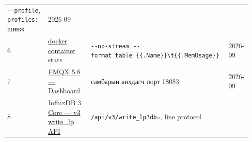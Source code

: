 \begin{longtable}[]{@{}llll@{}}
\begin{minipage}[t]{0.22\columnwidth}
\texttt{-\/-profile}, \texttt{profiles:} шинж\strut
\end{minipage} & \begin{minipage}[t]{0.22\columnwidth}\raggedright
2026-09\strut
\end{minipage}\tabularnewline
\begin{minipage}[t]{0.22\columnwidth}\raggedright
6\strut
\end{minipage} & \begin{minipage}[t]{0.22\columnwidth}\raggedright
\href{https://docs.docker.com/reference/cli/docker/container/stats/}{docker container stats}\strut
\end{minipage} & \begin{minipage}[t]{0.22\columnwidth}\raggedright
\texttt{-\/-no-stream}, \texttt{-\/-format\ \textquotesingle{}table\ \{\{.Name\}\}\textbackslash{}t\{\{.MemUsage\}\}\textquotesingle{}}\strut
\end{minipage} & \begin{minipage}[t]{0.22\columnwidth}\raggedright
2026-09\strut
\end{minipage}\tabularnewline
\begin{minipage}[t]{0.22\columnwidth}\raggedright
7\strut
\end{minipage} & \begin{minipage}[t]{0.22\columnwidth}\raggedright
\href{https://docs.emqx.com/en/emqx/v5.8/guides/dashboard/introduction.html}{EMQX 5.\allowbreak{}8 --- Dashboard}\strut
\end{minipage} & \begin{minipage}[t]{0.22\columnwidth}\raggedright
самбарын анхдагч порт 18083\strut
\end{minipage} & \begin{minipage}[t]{0.22\columnwidth}\raggedright
2026-09\strut
\end{minipage}\tabularnewline
\begin{minipage}[t]{0.22\columnwidth}\raggedright
8\strut
\end{minipage} & \begin{minipage}[t]{0.22\columnwidth}\raggedright
\href{https://docs.influxdata.com/influxdb3/core/write-data/http-api/v3-write-lp/}{InfluxDB 3 Core --- v3 write\_\allowbreak{}lp API}\strut
\end{minipage} & \begin{minipage}[t]{0.22\columnwidth}\raggedright
\texttt{/\allowbreak{}api/\allowbreak{}v3/\allowbreak{}write\_\allowbreak{}lp?\allowbreak{}db=\allowbreak{}}, line protocol\strut
\end{minipage} & \begin{minipage}[t]{0.22\columnwidth}\raggedright

\end{minipage}
\end{longtable}
